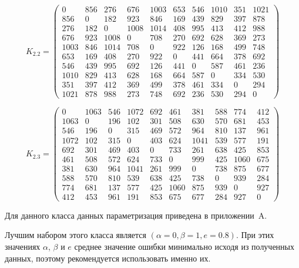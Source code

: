\begin{equation}
	\label{eq:kd2.2}
	K_{2.2} = \begin{pmatrix}
	0 & 856 & 276 & 676 & 1003 & 653 & 546 & 1010 & 351 & 1021 \\ 
	856 & 0 & 182 & 923 & 846 & 169 & 439 & 829 & 397 & 878 \\ 
	276 & 182 & 0 & 1008 & 1014 & 408 & 995 & 413 & 412 & 988 \\ 
	676 & 923 & 1008 & 0 & 708 & 270 & 692 & 628 & 369 & 273 \\ 
	1003 & 846 & 1014 & 708 & 0 & 922 & 126 & 168 & 499 & 748 \\ 
	653 & 169 & 408 & 270 & 922 & 0 & 441 & 664 & 378 & 692 \\ 
	546 & 439 & 995 & 692 & 126 & 441 & 0 & 587 & 461 & 236 \\ 
	1010 & 829 & 413 & 628 & 168 & 664 & 587 & 0 & 334 & 530 \\ 
	351 & 397 & 412 & 369 & 499 & 378 & 461 & 334 & 0 & 294 \\ 
	1021 & 878 & 988 & 273 & 748 & 692 & 236 & 530 & 294 & 0  
	\end{pmatrix}
\end{equation}

\begin{equation}
	\label{eq:kd2.3}
	K_{2.3} = \begin{pmatrix}
	0 & 1063 & 546 & 1072 & 692 & 461 & 381 & 588 & 774 & 412 \\ 
	1063 & 0 & 196 & 102 & 301 & 508 & 630 & 570 & 681 & 453 \\ 
	546 & 196 & 0 & 315 & 469 & 572 & 964 & 810 & 137 & 961 \\ 
	1072 & 102 & 315 & 0 & 403 & 624 & 1041 & 539 & 577 & 191 \\ 
	692 & 301 & 469 & 403 & 0 & 733 & 261 & 638 & 425 & 853 \\ 
	461 & 508 & 572 & 624 & 733 & 0 & 999 & 425 & 1060 & 675 \\ 
	381 & 630 & 964 & 1041 & 261 & 999 & 0 & 738 & 875 & 677 \\ 
	588 & 570 & 810 & 539 & 638 & 425 & 738 & 0 & 939 & 284 \\ 
	774 & 681 & 137 & 577 & 425 & 1060 & 875 & 939 & 0 & 927 \\ 
	412 & 453 & 961 & 191 & 853 & 675 & 677 & 284 & 927 & 0  
	\end{pmatrix}
\end{equation}

Для данного класса данных параметризация приведена в приложении~A.

Лучшим набором этого класса является $(\alpha = 0, \beta = 1, e = 0.8)$.
При этих значениях $\alpha$, $\beta$ и $e$ среднее значение ошибки минимально исходя из полученных данных, поэтому рекомендуется использовать именно их.

